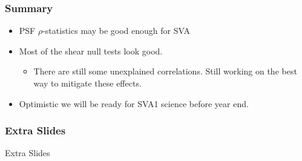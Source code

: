 \documentclass{beamer}
\newcommand{\ngmix}{{\bf ngmix}}
\newcommand{\imshape}{{\bf im3shape}}
\begin{document}
\frame
{
    \frametitle{Summary}

    \begin{itemize}

        \item PSF $\rho$-statistics may be good enough for SVA


        \item Most of the shear null tests look good.

            \begin{itemize}

                \item There are still some unexplained correlations.  Still working
                    on the best way to mitigate these effects.

            \end{itemize}
            
        \item Optimistic we will be ready for SVA1 science before year end.

    \end{itemize}
}


\frame
{
    \frametitle{Extra Slides}
    {\Huge Extra Slides}
}
\end{document}

